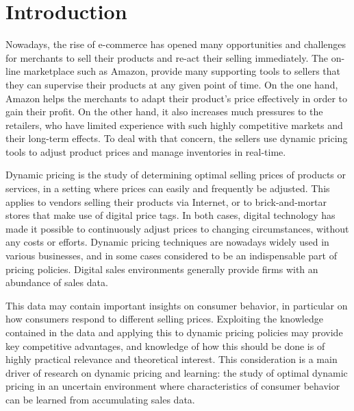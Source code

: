\section{Introduction}
\label{sec:introduction}

Nowadays, the rise of e-commerce has opened many opportunities and challenges 
for merchants to sell their products and re-act their selling immediately. 
The on-line marketplace such as Amazon, provide many supporting tools to sellers 
that they can supervise their products at any given point of time. 
On the one hand, Amazon helps the merchants to adapt their product's 
price effectively in order to gain their profit. On the other hand, it also increases 
much pressures to the retailers, who have limited experience with such highly
competitive markets and their long-term effects. To deal with that concern, the sellers 
use dynamic pricing tools to adjust product prices and manage inventories in real-time. 

Dynamic pricing is the study of determining optimal selling prices 
of products or services, in a setting where prices can easily and 
frequently be adjusted. This applies to vendors selling their 
products via Internet, or to brick-and-mortar stores that make use 
of digital price tags. In both cases, digital technology has made it 
possible to continuously adjust prices to changing circumstances, 
without any costs or efforts. Dynamic pricing techniques are nowadays 
widely used in various businesses, and in some cases considered to be 
an indispensable part of pricing policies. Digital sales environments 
generally provide firms with an abundance of sales data.

This data may contain important insights on consumer behavior, in 
particular on how consumers respond to different selling prices. 
Exploiting the knowledge contained in the data and applying this to 
dynamic pricing policies may provide key competitive advantages, 
and knowledge of how this should be done is of highly practical relevance 
and theoretical interest. This consideration is a main driver of 
research on dynamic pricing and learning: the study of optimal 
dynamic pricing in an uncertain environment where characteristics 
of consumer behavior can be learned from accumulating sales data. 

